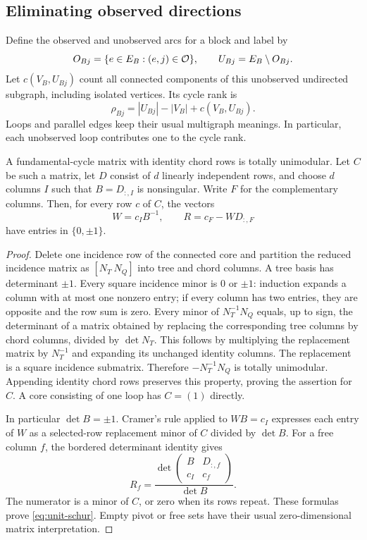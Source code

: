 \subsection{Eliminating observed directions}\label{subsec:observed-directions}
Define the observed and unobserved arcs for a block and label by
\[
 O_{Bj}=\{e\in E_B:(e,j)\in\mathcal O\},\qquad U_{Bj}=E_B\setminus O_{Bj}.
\]
Let $c(V_B,U_{Bj})$ count all connected components of this unobserved
undirected subgraph, including isolated vertices. Its cycle rank is
\begin{equation}\label{eq:unobserved-rank}
 \rho_{Bj}=|U_{Bj}|-|V_B|+c(V_B,U_{Bj}).
\end{equation}
Loops and parallel edges keep their usual multigraph meanings. In particular,
each unobserved loop contributes one to the cycle rank.

\begin{lemma}\label{lem:cycle-tu}
A fundamental-cycle matrix with identity chord rows is totally unimodular.
Let $C$ be such a matrix, let $D$ consist of $d$ linearly independent rows,
and choose $d$ columns $I$ such that $B=D_{:,I}$ is nonsingular. Write $F$
for the complementary columns. Then, for every row $c$ of $C$, the vectors
\begin{equation}\label{eq:unit-schur}
 W=c_I B^{-1},\qquad R=c_F-WD_{:,F}
\end{equation}
have entries in $\{0,\pm1\}$.
\end{lemma}
\begin{proof}
Delete one incidence row of the connected core and partition the reduced
incidence matrix as $[N_T\ N_Q]$ into tree and chord columns. A tree
basis has determinant $\pm1$. Every square incidence minor is $0$ or
$\pm1$: induction expands a column with at most one nonzero entry; if
every column has two entries, they are opposite and the row sum is zero.
Every minor of $N_T^{-1}N_Q$ equals, up to sign, the determinant of a
matrix obtained by replacing the corresponding tree columns by chord
columns, divided by $\det N_T$. This follows by multiplying the replacement
matrix by $N_T^{-1}$ and expanding its unchanged identity columns.
The replacement is a square incidence submatrix. Therefore
$-N_T^{-1}N_Q$ is totally unimodular. Appending identity chord rows
preserves this property, proving the assertion for $C$. A core consisting
of one loop has $C=(1)$ directly.

In particular $\det B=\pm1$. Cramer's rule applied to $WB=c_I$ expresses
each entry of $W$ as a selected-row replacement minor of $C$ divided by
$\det B$. For a free column $f$, the bordered determinant identity gives
\[
 R_f=\frac{\det\begin{pmatrix}B&D_{:,f}\\c_I&c_f\end{pmatrix}}
                  {\det B}.
\]
The numerator is a minor of $C$, or zero when its rows repeat. These
formulas prove \eqref{eq:unit-schur}. Empty pivot or free sets have their
usual zero-dimensional matrix interpretation.
\end{proof}

